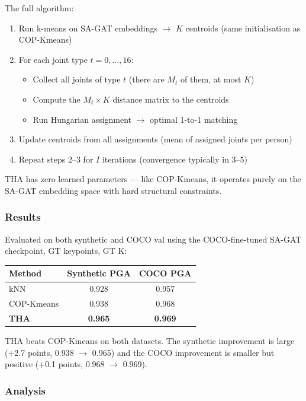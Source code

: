 The full algorithm:
\begin{enumerate}
    \item Run k-means on SA-GAT embeddings $\to$ $K$ centroids (same initialisation as COP-Kmeans)
    \item For each joint type $t = 0, \ldots, 16$:
    \begin{itemize}
        \item Collect all joints of type $t$ (there are $M_t$ of them, at most $K$)
        \item Compute the $M_t \times K$ distance matrix to the centroids
        \item Run Hungarian assignment $\to$ optimal 1-to-1 matching
    \end{itemize}
    \item Update centroids from all assignments (mean of assigned joints per person)
    \item Repeat steps 2--3 for $I$ iterations (convergence typically in 3--5)
\end{enumerate}

THA has zero learned parameters --- like COP-Kmeans, it operates purely on the SA-GAT embedding space with hard structural constraints.

\subsubsection{Results}

Evaluated on both synthetic and COCO val using the COCO-fine-tuned SA-GAT checkpoint, GT keypoints, GT K:

\begin{tabular}{lcc}
\hline
\textbf{Method} & \textbf{Synthetic PGA} & \textbf{COCO PGA} \\
\hline
kNN & 0.928 & 0.957 \\
COP-Kmeans & 0.938 & 0.968 \\
\textbf{THA} & \textbf{0.965} & \textbf{0.969} \\
\hline
\end{tabular}

\vspace{0.5em}

THA beats COP-Kmeans on both datasets. The synthetic improvement is large (+2.7 points, 0.938 $\to$ 0.965) and the COCO improvement is smaller but positive (+0.1 points, 0.968 $\to$ 0.969).

\subsubsection{Analysis}

